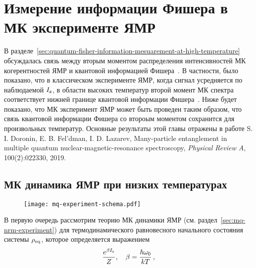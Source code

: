 \chapter{Измерение информации Фишера в МК эксперименте ЯМР}
\label{chapter:quantum-fisher-information-measurement}

В разделе~\ref{sec:quantum-fisher-information-mesuarement-at-high-temperature}
обсуждалась связь между вторым моментом распределения интенсивностей МК когерентностей ЯМР и квантовой информацией Фишера~\cite{Toth2014,Pezze2018}.
В частности, было показано,
что в классическом эксперименте ЯМР, когда сигнал усредняется по наблюдаемой $I_\mathrm{z}$, в области высоких температур второй момент МК спектра соответствует нижней границе квантовой информации Фишера~\cite{Garttner2018}.
Ниже будет показано, что МК эксперимент ЯМР может быть проведен таким образом,
что связь квантовой информации Фишера со второым моментом сохранится для произвольных температур. 
Основные результаты этой главы отражены в работе 
S. I. Doronin, E. B. Fel'dman,  I. D. Lazarev, Many-particle entanglement in multiple quantum nuclear-magnetic-resonance spectroscopy, \textit{Physical Review A}, 100(2):022330, 2019. 


\section{МК динамика ЯМР при низких температурах}
\begin{figure}[H]
  \centering
  \texttt{[image: mq-experiment-schema.pdf]}
  \caption{\protect}
  \label{fig:mq-experiment-schema}
\end{figure}

В первую очередь рассмотрим теорию МК динамики ЯМР (см. раздел~\ref{sec:mq-nrm-experiment})
для термодинамического равновесного начального состояния системы $\rho_\mathrm{eq}$,
которое определяется выражением
%
\begin{equation}\label{eq:rho_eq}
  \dfrac{e^{\beta I_\mathrm{z}}}{Z}, \quad \beta = \frac{\hbar\omega_{0}}{kT} \, ,
\end{equation}
%
\rhoEqExplanatoryNote

